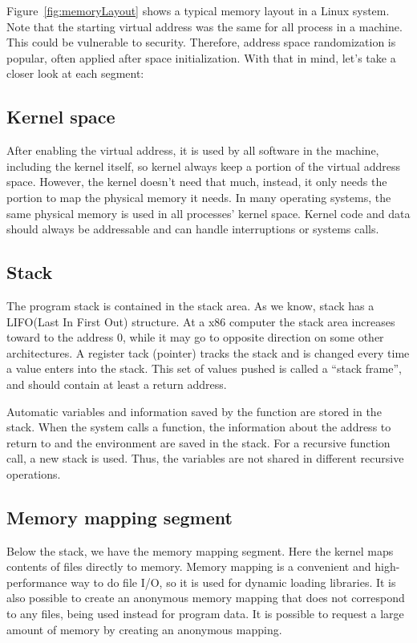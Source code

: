 \documentclass[doc,natbib,12pt]{apa6}
\begin{document}
	Figure~\vref{fig:memoryLayout} shows a typical memory layout in a Linux system. Note that the starting virtual address was the same for all process in a machine. This could be vulnerable to security. Therefore, address space randomization is popular, often applied after space initialization. With that in mind, let's take a closer look at each segment:
	
	\subsection{Kernel space}
	After enabling the virtual address, it is used by all software in the machine, including the kernel itself, so kernel always keep a portion of the virtual address space. However, the kernel doesn't need that much, instead, it only needs the portion to map the physical memory it needs. In many operating systems, the same physical memory is used in all processes' kernel space. Kernel code and data should always be addressable and can handle interruptions or systems calls.
	
	\subsection{Stack}
	The program stack is contained in the stack area. As we know, stack has a LIFO(Last In First Out) structure. At a x86 computer the stack area increases toward to the address 0, while it may go to opposite direction on some other architectures. A register tack (pointer) tracks the stack and is changed every time a value enters into the stack. This set of values pushed is called a ``stack frame'', and should contain at least a return address.
	
	Automatic variables and information saved by the function are stored in the stack. When the system calls a function, the information about the address to return to and the environment are saved in the stack. For a recursive function call, a new stack is used. Thus, the variables are not shared in different recursive operations.
	
	\subsection{Memory mapping segment}
	Below the stack, we have the memory mapping segment. Here the kernel maps contents of files directly to memory. Memory mapping is a convenient and high-performance way to do file I/O, so it is used for dynamic loading libraries. It is also possible to create an anonymous memory mapping that does not correspond to any files, being used instead for program data. It is possible to request a large amount of memory by creating an anonymous mapping.
	
\end{document}
